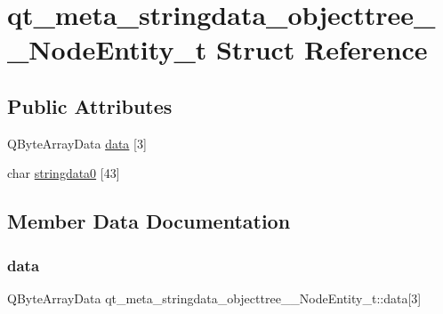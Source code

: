 \hypertarget{structqt__meta__stringdata__objecttree_____node_entity__t}{}\section{qt\+\_\+meta\+\_\+stringdata\+\_\+objecttree\+\_\+\+\_\+\+Node\+Entity\+\_\+t Struct Reference}
\label{structqt__meta__stringdata__objecttree_____node_entity__t}
\subsection*{Public Attributes}
\begin{DoxyCompactItemize}
\item 
Q\+Byte\+Array\+Data \mbox{\hyperlink{structqt__meta__stringdata__objecttree_____node_entity__t_a82f786668ed625faec0cad677a1fa56d}{data}} \mbox{[}3\mbox{]}
\item 
char \mbox{\hyperlink{structqt__meta__stringdata__objecttree_____node_entity__t_a2ac1d1e6a0a444c8486fd671e6506365}{stringdata0}} \mbox{[}43\mbox{]}
\end{DoxyCompactItemize}


\subsection{Member Data Documentation}
\mbox{\label{structqt__meta__stringdata__objecttree_____node_entity__t_a82f786668ed625faec0cad677a1fa56d}} 
\subsubsection{\texorpdfstring{data}{data}}
{\footnotesize\ttfamily Q\+Byte\+Array\+Data qt\+\_\+meta\+\_\+stringdata\+\_\+objecttree\+\_\+\+\_\+\+Node\+Entity\+\_\+t\+::data\mbox{[}3\mbox{]}}

\mbox{\label{structqt__meta__stringdata__objecttree_____node_entity__t_a2ac1d1e6a0a444c8486fd671e6506365}} 
